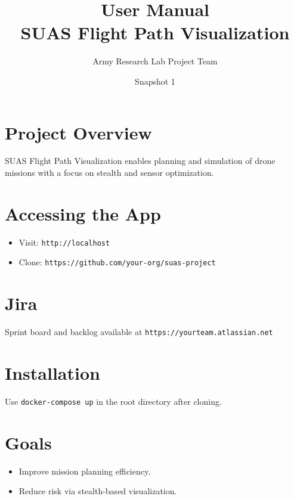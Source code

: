 \documentclass[12pt]{article}
\title{User Manual\\SUAS Flight Path Visualization}
\author{Army Research Lab Project Team}
\date{Snapshot 1}
\begin{document}
\maketitle

\section{Project Overview}
SUAS Flight Path Visualization enables planning and simulation of drone missions with a focus on stealth and sensor optimization.

\section{Accessing the App}
\begin{itemize}
  \item Visit: \texttt{http://localhost}
  \item Clone: \texttt{https://github.com/your-org/suas-project}
\end{itemize}

\section{Jira}
Sprint board and backlog available at \texttt{https://yourteam.atlassian.net}

\section{Installation}
Use \texttt{docker-compose up} in the root directory after cloning.

\section{Goals}
\begin{itemize}
  \item Improve mission planning efficiency.
  \item Reduce risk via stealth-based visualization.
\end{itemize}
\end{document}
